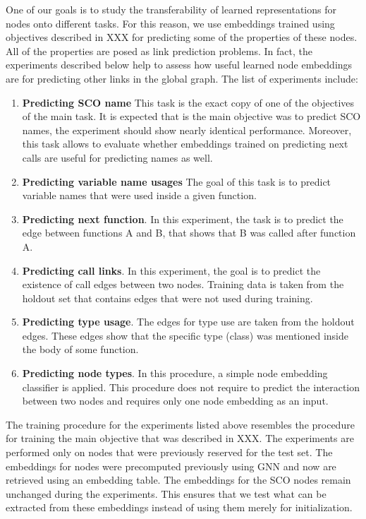 \documentclass[a4paper,twoside]{article}
\begin{document}
One of our goals is to study the transferability of learned representations for nodes onto different tasks. For this reason, we use embeddings trained using objectives described in XXX for predicting some of the properties of these nodes. All of the properties are posed as link prediction problems. In fact, the experiments described below help to assess how useful learned node embeddings are for predicting other links in the global graph. The list of experiments include:
\begin{enumerate}
    \item \textbf{Predicting SCO name} 
    This task is the exact copy of one of the objectives of the main task. It is expected that is the main objective was to predict SCO names, the experiment should show nearly identical performance. Moreover, this task allows to evaluate whether embeddings trained on predicting next calls are useful for predicting names as well. 
    \item \textbf{Predicting variable name usages}
    The goal of this task is to predict variable names that were used inside a given function.
    \item \textbf{Predicting next function}.
    In this experiment, the task is to predict the edge between functions A and B, that shows that B was called after function A. 
    \item \textbf{Predicting call links}. 
    In this experiment, the goal is to predict the existence of call edges between two nodes. Training data is taken from the holdout set that contains edges that were not used during training. 
    \item \textbf{Predicting type usage}.
    The edges for type use are taken from the holdout edges. These edges show that the specific type (class) was mentioned inside the body of some function. 
    \item \textbf{Predicting node types}.
    In this procedure, a simple node embedding classifier is applied. This procedure does not require to predict the interaction between two nodes and requires only one node embedding as an input. 
\end{enumerate}

The training procedure for the experiments listed above resembles the procedure for training the main objective that was described in XXX. The experiments are performed only on nodes that were previously reserved for the test set. The embeddings for nodes were precomputed previously using GNN and now are retrieved using an embedding table. The embeddings for the SCO nodes remain unchanged during the experiments. This ensures that we test what can be extracted from these embeddings instead of using them merely for initialization. 
\end{document}
